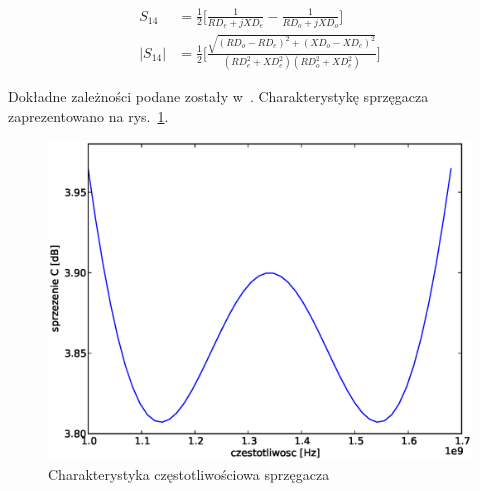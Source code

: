 \documentclass[rep.tex]{subfiles}
\begin{document}
\begin{align}
  S_{14} &= \frac{1}{2} \bigg[ \frac{1}{RD_e + jXD_e} - \frac{1}{RD_o + jXD_o}\bigg] \\
  |S_{14}| &= \frac{1}{2} \bigg[\frac{\sqrt{(RD_o - RD_e)^2 + (XD_o - XD_e)^2}}{(RD_e^2 + XD_e^2)(RD_o^2 + XD_e^2)} \bigg]
\end{align}

Dokładne zależności podane zostały w~\cite{obwody}.
Charakterystykę sprzęgacza zaprezentowano na rys.~\ref{fig:zad12:freq}.

\begin{figure}[!htbp]
  \centering
  \includegraphics[scale=0.5]{fig/zad12/freq}
  \caption{Charakterystyka częstotliwościowa sprzęgacza}
  \label{fig:zad12:freq}
\end{figure}
\end{document}
